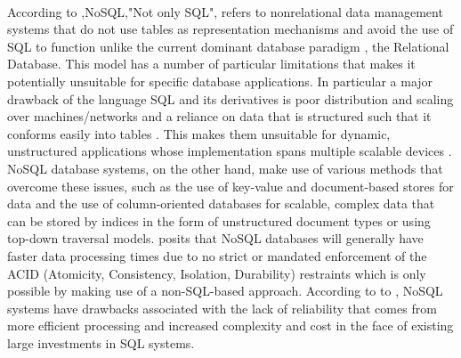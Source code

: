 \documentclass[12pt]{article}
\begin{document}
\paragraph{}
According to \cite{hossain13},NoSQL,"Not only SQL", refers to nonrelational data management systems that do not use tables as representation mechanisms and avoid the use of SQL to function unlike the current dominant database paradigm \citep{leavitt10}, the Relational Database. This model has a number of particular limitations that makes it potentially unsuitable for specific database applications. In particular a major drawback of the language SQL and its derivatives is poor distribution and scaling over machines/networks and a reliance on data that is structured such that it conforms easily into tables \citep{leavitt10}. This makes them unsuitable for dynamic, unstructured applications whose implementation spans multiple scalable devices \cite{mcCreary14}. NoSQL database systems, on the other hand, make use of various methods \citep{leavitt10} that overcome these issues, such as the use of key-value and document-based stores for data and the use of column-oriented databases for scalable, complex data that can be stored by indices in the form of unstructured document types or using top-down traversal models. \citep{leavitt10} posits that NoSQL databases will generally have faster data processing times due to no strict or mandated enforcement of the ACID (Atomicity, Consistency, Isolation, Durability) restraints which is only possible by making use of a non-SQL-based approach. According to to \citep{leavitt10}, NoSQL systems have drawbacks associated with the lack of reliability that comes from more efficient processing and increased complexity and cost in the face of existing large investments in SQL systems.
\end{document}

